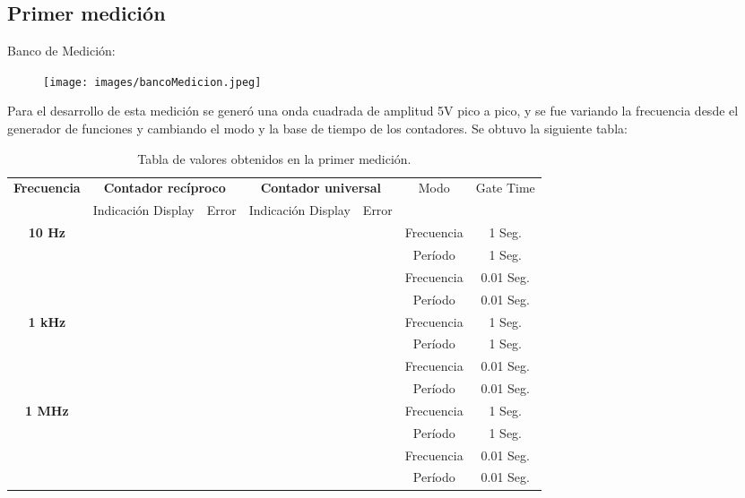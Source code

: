 \documentclass{article}
\begin{document}
\subsection{Primer medición}
	
	Banco de Medición:
	
	\begin{figure}[h]
				\centering
				\texttt{[image: images/bancoMedicion.jpeg]}
				\medskip
	\end{figure}
	\bigskip\bigskip	

	Para el desarrollo de esta medición se generó una onda cuadrada de amplitud 5V pico a pico, y se fue variando la frecuencia desde el generador de funciones y cambiando el modo y la base de tiempo de los contadores. Se obtuvo la siguiente tabla:

\newpage
\begin{table}[!hbt]
	\begin{center}

		\begin{tabular}{|c|c|c|c|c|c|c|} \hline
			\multirow{2}{*}{\textbf{Frecuencia}}
			& \multicolumn{2}{c|}{\textbf{Contador recíproco}} & \multicolumn{2}{c|}{\textbf{Contador universal}} & \multirow{2}{*}{Modo} & \multirow{2}{*}{Gate Time} \\\cline{2-5}
			& Indicación Display & Error & Indicación Display & Error \\\hline
			
			\multirow{4}{*}{\textbf{10 Hz}}
			&  &  &  &  & Frecuencia & 1 Seg. \\\cline{2-7}
			&  &  &  &  & Período & 1 Seg. \\\cline{2-7}
			&  &  &  &  & Frecuencia & 0.01 Seg. \\\cline{2-7}
			&  &  &  &  & Período & 0.01 Seg. \\\hline

			\multirow{4}{*}{\textbf{1 kHz}}
			&  &  &  &  & Frecuencia & 1 Seg. \\\cline{2-7}
			&  &  &  &  & Período & 1 Seg. \\\cline{2-7}
			&  &  &  &  & Frecuencia & 0.01 Seg. \\\cline{2-7}
			&  &  &  &  & Período & 0.01 Seg. \\\hline

			\multirow{4}{*}{\textbf{1 MHz}}
			&  &  &  &  & Frecuencia & 1 Seg. \\\cline{2-7}
			&  &  &  &  & Período & 1 Seg. \\\cline{2-7}
			&  &  &  &  & Frecuencia & 0.01 Seg. \\\cline{2-7}
			&  &  &  &  & Período & 0.01 Seg. \\\hline
		\end{tabular}

	\caption{Tabla de valores obtenidos en la primer medición.}
	\end{center}
\end{table}
\medskip
\end{document}
